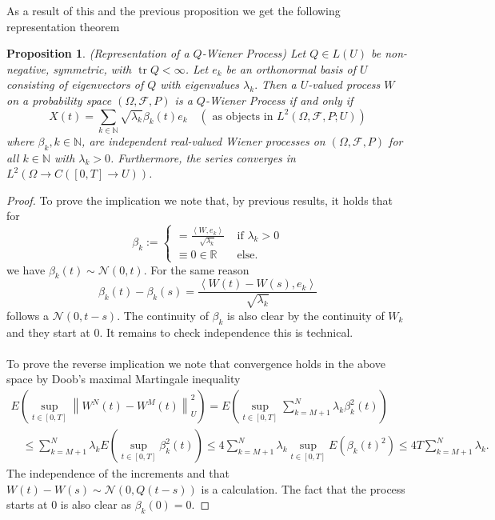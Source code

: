 \documentclass[12pt]{article}
\newtheorem{proposition}{Proposition}
\begin{document}
As a result of this and the previous proposition we get the following representation theorem
\begin{proposition}(Representation of a $Q$-Wiener Process) Let $Q \in L(U)$ be non-negative, symmetric, with $\operatorname{tr} Q<\infty$. Let $e_{k}$ be an orthonormal basis of $U$ consisting of eigenvectors of $Q$ with eigenvalues $\lambda_{k}.$
	Then a $U$-valued process $W$ on a probability space $(\Omega, \mathcal{F}, P)$ is a $Q$-Wiener Process if and only if
	$$
		X(t)=\sum_{k \in \mathbb{N}} \sqrt{\lambda_{k}} \beta_{k}(t) e_{k} \quad\left(\text { as objects in } L^2(\Omega, \mathcal{F}, P ; U)\right)
	$$
	where $\beta_{k}, k \in \mathbb{N}$, are independent real-valued Wiener processes on $(\Omega, \mathcal{F}, P)$ for all $k \in \mathbb{N}$ with $\lambda_{k}>0$. Furthermore, the series converges in $L^2(\Omega\to C([0,T]\to U))$.
\end{proposition}
\begin{proof}
	To prove the implication we note that, by previous results, it holds that for
	\begin{equation*}
		\beta_{k}:=\left\{\begin{array}{ll}
			=\frac{\left\langle W, e_{k}\right\rangle}{\sqrt{\lambda_{k}}} & \text { if } \lambda_{k}>0 \\
			\equiv 0 \in \mathbb{R}                                        & \text { else.}
		\end{array}\right.
	\end{equation*}
	we have $\beta_k(t)\sim\mathcal{N}(0,t)$. For the same reason
	\begin{equation*}
		\beta_{k}(t)-\beta_{k}(s)=\frac{\left\langle W(t)-W(s), e_{k}\right\rangle}{\sqrt{\lambda_{k}}}
	\end{equation*}
	follows a $\mathcal{N}(0,t-s)$. The continuity of $\beta_k$ is also clear by the continuity of $W_k$ and they start at $0$. It remains to check independence this is technical.\\
	\\
	To prove the reverse implication we note that convergence holds in the above space by Doob's maximal Martingale inequality
	\begin{multline*}
		E\left(\sup _{t \in[0, T]}\left\|W^{N}(t)-W^{M}(t)\right\|_{U}^2\right)=E\left(\sup _{t \in[0, T]} \sum_{k=M+1}^{N} \lambda_{k} \beta_{k}^2(t)\right) \\
		\quad \leq \sum_{k=M+1}^{N} \lambda_{k} E\left(\sup _{t \in[0, T]} \beta_{k}^2(t)\right) \leq 4 \sum_{k=M+1}^{N} \lambda_{k} \sup _{t \in[0, T]} E\left(\beta_{k}(t)^2\right) \leq 4 T \sum_{k=M+1}^{N} \lambda_{k}.
	\end{multline*}
	The independence of the increments and that $W(t)-W(s)\sim \mathcal{N}(0,Q(t-s))$ is a calculation. The fact that the process starts at $0$ is also clear as $\beta_k(0)=0$.
\end{proof}
\end{document}
